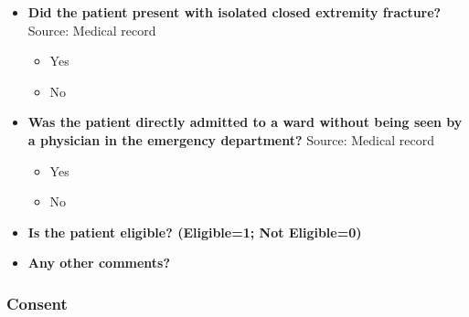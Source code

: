 \documentclass[
]{scrartcl}
\providecommand{\tightlist}{%
  \setlength{\itemsep}{0pt}\setlength{\parskip}{0pt}}\usepackage{longtable,booktabs,array}
\begin{document}
\begin{itemize}
  \begin{itemize}
  \tightlist
  \item
    Yes
  \item
    No
  \end{itemize}
\item
  \textbf{Did the patient present with isolated closed extremity
  fracture?} Source: Medical record

  \begin{itemize}
  \tightlist
  \item
    Yes
  \item
    No
  \end{itemize}
\item
  \textbf{Was the patient directly admitted to a ward without being seen
  by a physician in the emergency department?} Source: Medical record

  \begin{itemize}
  \tightlist
  \item
    Yes
  \item
    No
  \end{itemize}
\item
  \textbf{Is the patient eligible? (Eligible=1; Not Eligible=0)}
\item
  \textbf{Any other comments?}
\end{itemize}

\subsubsection{Consent}\label{consent}
\end{document}
